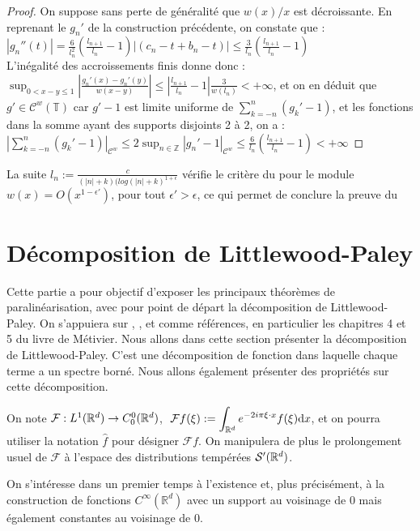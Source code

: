 \documentclass[11pt,a4paper]{article}
\begin{document}
\begin{proof}
 On suppose sans perte de généralité que $w(x)/x$ est décroissante. En reprenant le $g_n'$ de la construction précédente, on constate que :  \\

$\displaystyle |g_n''(t)| = \frac{6}{l_n^2}(\frac{l_{n+1}}{l_n}-1)|(c_n-t + b_n -t)| \leq  \frac{3}{l_n}(\frac{l_{n+1}}{l_n}-1) $ \\

L'inégalité des accroissements finis donne donc : \\

$\displaystyle \sup_{0<x-y\leq 1} \left | \frac{g_n'(x) - g_n'(y)}{w(x-y)}\right | \leq \left | \frac{l_{n+1}}{l_n}-1\right | \frac{3}{w(l_n)} < +\infty$, et on en déduit que $g' \in \mathcal{C}^w(\mathbb{T})$ car $g'-1$ est limite uniforme de $\displaystyle  \sum_{k = -n}^n (g_k'-1)$, et les fonctions dans la somme ayant des supports disjoints 2 à 2, on a :\\

$\displaystyle  \left | \sum_{k = -n}^n (g_k'-1) \right |_{\mathcal{C}^w} \leq 2\sup_{n \in \mathbb{Z}} |g_n' -1|_{\mathcal{C}^w} \leq \frac{6}{l_n}(\frac{l_{n+1}}{l_n}-1) < + \infty $ 
\end{proof}

La suite $ \displaystyle l_n := \frac{c}{(|n|+k)(log(|n| + k)^{1+\epsilon}}$ vérifie le critère du  pour le module $w(x)=O(x^{1-\epsilon'})$, pour tout $\epsilon' > \epsilon$, ce qui permet de conclure la preuve du 

\section{Décomposition de Littlewood-Paley}
Cette partie a pour objectif d'exposer les principaux théorèmes de paralinéarisation, avec pour point de départ la décomposition de Littlewood-Paley. On s'appuiera sur \cite{metivier}, \cite{dgv}, et \cite{alinhac_gerard} comme références, en particulier les chapitres 4 et 5 du livre de Métivier.
Nous allons dans cette section présenter la décomposition de Littlewood-Paley. C'est une décomposition de fonction dans laquelle chaque terme a un spectre borné. Nous allons également présenter des propriétés sur cette décomposition. 
\begin{defin}
On note $\mathcal{F} : L^1(\mathbb R^d) \to C^0_0(\mathbb R^d)$,  $\ \mathcal{F}f(\xi) := \displaystyle \int_{\mathbb R^d} e^{-2i\pi \xi \cdot x}f(\xi)\mathrm{d}x$, et on pourra utiliser la notation $\hat{f}$ pour désigner $\mathcal{F}f$. On manipulera de plus le prolongement usuel de $\mathcal{F}$ à l'espace des distributions tempérées $\mathcal{S}'(\mathbb R^d)$.
\end{defin}
On s'intéresse dans un premier temps à l'existence et, plus précisément, à la construction de fonctions $C^\infty(\mathbb{R}^d)$ avec un support au voisinage de 0 mais également constantes au voisinage de 0.
\end{document}

